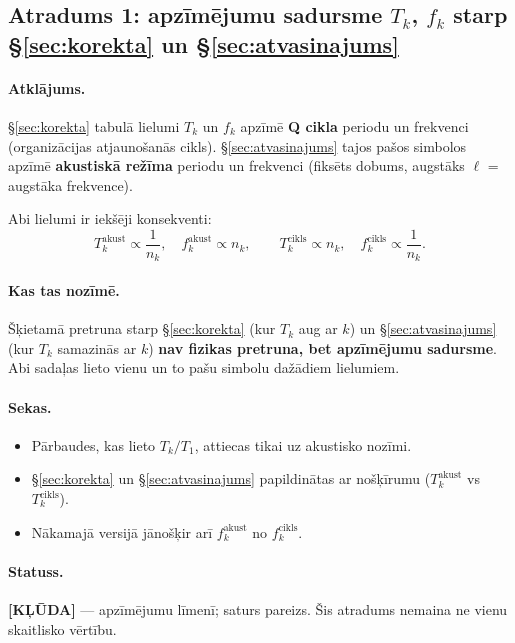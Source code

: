 \documentclass[12pt,a4paper]{article}
\begin{document}
\subsection*{Atradums 1: apzīmējumu sadursme $T_k$, $f_k$ starp \S\ref{sec:korekta} un \S\ref{sec:atvasinajums}}

\paragraph{Atklājums.}
\S\ref{sec:korekta} tabulā lielumi $T_k$ un $f_k$ apzīmē \textbf{Q cikla} periodu un frekvenci (organizācijas atjaunošanās cikls). \S\ref{sec:atvasinajums} tajos pašos simbolos apzīmē \textbf{akustiskā režīma} periodu un frekvenci (fiksēts dobums, augstāks $\ell$ = augstāka frekvence).

Abi lielumi ir iekšēji konsekventi:
\[
T_k^{\text{akust}} \propto \frac{1}{n_k}, \quad f_k^{\text{akust}} \propto n_k,
\qquad
T_k^{\text{cikls}} \propto n_k, \quad f_k^{\text{cikls}} \propto \frac{1}{n_k}.
\]

\paragraph{Kas tas nozīmē.}
Šķietamā pretruna starp \S\ref{sec:korekta} (kur $T_k$ aug ar $k$) un \S\ref{sec:atvasinajums} (kur $T_k$ samazinās ar $k$) \textbf{nav fizikas pretruna, bet apzīmējumu sadursme}. Abi sadaļas lieto vienu un to pašu simbolu dažādiem lielumiem.

\paragraph{Sekas.}
\begin{itemize}
    \item Pārbaudes, kas lieto $T_k/T_1$, attiecas tikai uz akustisko nozīmi.
    \item \S\ref{sec:korekta} un \S\ref{sec:atvasinajums} papildinātas ar nošķīrumu ($T_k^{\text{akust}}$ vs $T_k^{\text{cikls}}$).
    \item Nākamajā versijā jānošķir arī $f_k^{\text{akust}}$ no $f_k^{\text{cikls}}$.
\end{itemize}

\paragraph{Statuss.}
\textbf{[KĻŪDA]} — apzīmējumu līmenī; saturs pareizs. Šis atradums nemaina ne vienu skaitlisko vērtību.
\end{document}
